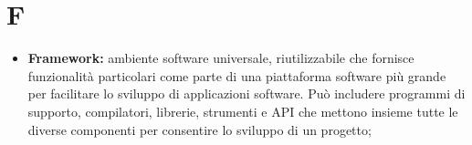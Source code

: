 %


\section*{F} %
\label{sec:f}
	\begin{itemize}
		\item \textbf{Framework:} ambiente software universale, riutilizzabile che fornisce funzionalità particolari come parte di una piattaforma software più grande per facilitare lo sviluppo di applicazioni software. Può includere programmi di supporto, compilatori, librerie, strumenti e API che mettono insieme tutte le diverse componenti per consentire lo sviluppo di un progetto;
	\end{itemize}
\pagebreak

